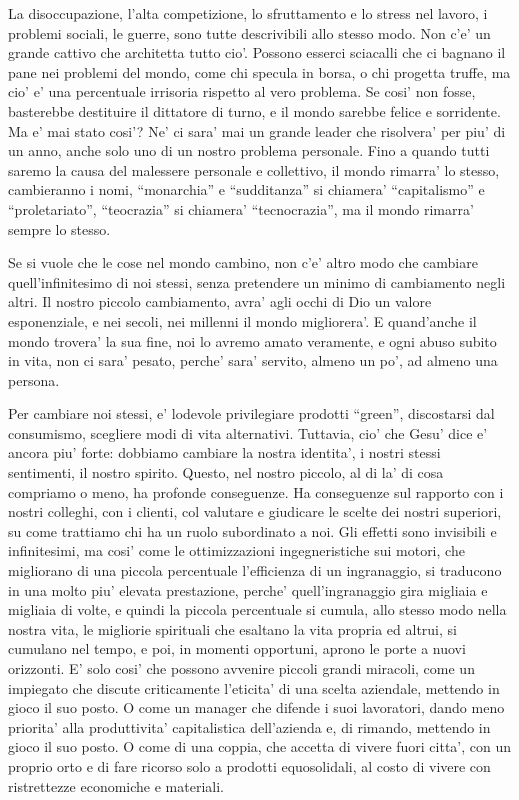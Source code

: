 La disoccupazione, l'alta competizione, lo sfruttamento e lo stress nel lavoro, i problemi sociali, le guerre, sono tutte descrivibili allo stesso modo. Non c'e' un grande cattivo che architetta tutto cio'. Possono esserci sciacalli che ci bagnano il pane nei problemi del mondo, come chi specula in borsa, o chi progetta truffe, ma cio' e' una percentuale irrisoria rispetto al vero problema. Se cosi' non fosse, basterebbe destituire il dittatore di turno, e il mondo sarebbe felice e sorridente. Ma e' mai stato cosi'? Ne' ci sara' mai un grande leader che risolvera' per piu' di un anno, anche solo uno di un nostro problema personale. Fino a quando tutti saremo la causa del malessere personale e collettivo, il mondo rimarra' lo stesso, cambieranno i nomi, ``monarchia'' e ``sudditanza'' si chiamera' ``capitalismo'' e ``proletariato'', ``teocrazia'' si chiamera' ``tecnocrazia'', ma il mondo rimarra' sempre lo stesso.

Se si vuole che le cose nel mondo cambino, non c'e' altro modo che cambiare quell'infinitesimo di noi stessi, senza pretendere un minimo di cambiamento negli altri. Il nostro piccolo cambiamento, avra' agli occhi di Dio un valore esponenziale, e nei secoli, nei millenni il mondo migliorera'. E quand'anche il mondo trovera' la sua fine, noi lo avremo amato veramente, e ogni abuso subito in vita, non ci sara' pesato, perche' sara' servito, almeno un po', ad almeno una persona.

Per cambiare noi stessi, e' lodevole privilegiare prodotti ``green'', discostarsi dal consumismo, scegliere modi di vita alternativi. Tuttavia, cio' che Gesu' dice e' ancora piu' forte: dobbiamo cambiare la nostra identita', i nostri stessi sentimenti, il nostro spirito. Questo, nel nostro piccolo, al di la' di cosa compriamo o meno, ha profonde conseguenze. Ha conseguenze sul rapporto con i nostri colleghi, con i clienti, col valutare e giudicare le scelte dei nostri superiori, su come trattiamo chi ha un ruolo subordinato a noi. Gli effetti sono invisibili e infinitesimi, ma cosi' come le ottimizzazioni ingegneristiche sui motori, che migliorano di una piccola percentuale l'efficienza di un ingranaggio, si traducono in una molto piu' elevata prestazione, perche' quell'ingranaggio gira migliaia e migliaia di volte, e quindi la piccola percentuale si cumula, allo stesso modo nella nostra vita, le migliorie spirituali che esaltano la vita propria ed altrui, si cumulano nel tempo, e poi, in momenti opportuni, aprono le porte a nuovi orizzonti. E' solo cosi' che possono avvenire piccoli grandi miracoli, come un impiegato che discute criticamente l'eticita' di una scelta aziendale, mettendo in gioco il suo posto. O come un manager che difende i suoi lavoratori, dando meno priorita' alla produttivita' capitalistica dell'azienda e, di rimando, mettendo in gioco il suo posto. O come di una coppia, che accetta di vivere fuori citta', con un proprio orto e di fare ricorso solo a prodotti equosolidali, al costo di vivere con ristrettezze economiche e materiali.

